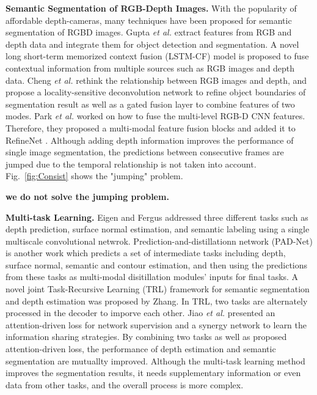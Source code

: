 \noindent \textbf{Semantic Segmentation of RGB-Depth Images.}
%
With the popularity of affordable depth-cameras, many techniques have been proposed for semantic segmentation of RGBD images.
%
Gupta \emph{et al.} \cite{Gupta2014} extract features from RGB and depth data and integrate them for object detection and segmentation.
%
A novel long short-term memorized context fusion (LSTM-CF) model is proposed \cite{Li2016} to fuse contextual information from multiple sources such as RGB images and depth data.
% 
Cheng \emph{et al.} \cite{Cheng2017} rethink the relationship between RGB images and depth, and propose a locality-sensitive deconvolution network to refine object boundaries of segmentation result as well as a gated fusion layer to combine features of two modes.
%
Park \emph{et al.} \cite{Park2017} worked on how to fuse the multi-level RGB-D CNN features.
%
Therefore, they proposed a multi-modal feature fusion blocks and added it to RefineNet \cite{Lin2017}.
%
Although adding depth information improves the performance of single image segmentation, the predictions between consecutive frames are jumped due to the temporal relationship is not taken into account.
%
Fig.~\ref{fig:Consist} shows the "jumping" problem.

\textbf{we do not solve the jumping problem.}

{\bf Multi-task Learning.} 
%
Eigen and Fergus \cite{Eigen2015} addressed three different tasks such as depth prediction, surface normal estimation, and semantic labeling using a single multiscale convolutional netwrok. 
%
Prediction-and-distillationn network (PAD-Net) is another work\cite{Xu2018} which predicts a set of intermediate tasks including depth, surface normal, semantic and contour estimation, and then using the predictions from these tasks as multi-modal disitillation modules' inputs for final tasks.  
%
A novel joint Task-Recursive Learning (TRL) \cite{Zhang2018} framework for semantic segmentation and depth estimation was proposed by Zhang. 
%
In TRL, two tasks are alternately processed in the decoder to imporve each other.
% 
Jiao \emph{et al.} \cite{Jiao2018} presented an attention-driven loss for network supervision and a synergy network to learn the information sharing strategies. 
%
By combining two tasks as well as proposed attention-driven loss, the performance of depth estimation and semantic segmentation are mutuallty improved.
%
Although the multi-task learning method improves the segmentation results, it needs supplementary information or even data from other tasks, and the overall process is more complex.

